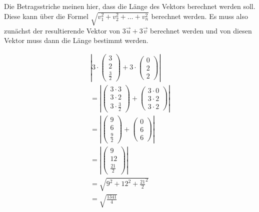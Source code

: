 Die Betragsstriche meinen hier, dass die Länge des Vektors berechnet werden
soll. Diese kann über die Formel $\sqrt{v_1^2 + v_2^2 + \dots + v_n^2}$
berechnet werden. Es muss also zunächst der resultierende Vektor von $3\vec{u}
    + 3\vec{v}$ berechnet werden und von diesen Vektor muss dann die Länge bestimmt
werden.

\begin{align*}
    \left|3 \cdot \begin{pmatrix}
                      3 \\ 2 \\ \frac{3}{2}
                  \end{pmatrix} + 3 \cdot \begin{pmatrix}
                                              0 \\ 2 \\ 2
                                          \end{pmatrix}\right| \\
    = \left|\begin{pmatrix}
                3 \cdot 3 \\ 3 \cdot 2 \\ 3 \cdot \frac{3}{2}
            \end{pmatrix} + \begin{pmatrix}
                                3 \cdot 0 \\ 3 \cdot 2 \\ 3 \cdot 2
                            \end{pmatrix}\right| \\
    = \left|\begin{pmatrix}
                9 \\ 6 \\ \frac{9}{2}
            \end{pmatrix} + \begin{pmatrix}
                                0 \\ 6 \\ 6
                            \end{pmatrix}\right|               \\
    = \left|\begin{pmatrix}
                9 \\ 12 \\ \frac{21}{2}
            \end{pmatrix}\right|                             \\
    = \sqrt{9^2 + 12^2 + \frac{21}{2}^2}                       \\
    = \sqrt{\frac{1341}{4}}
\end{align*}


